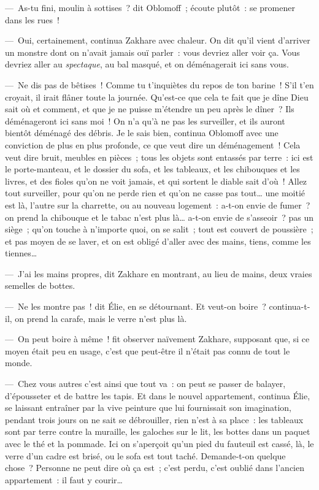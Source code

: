 \documentclass[french,twoside]{book} %
\begin{document}
— As-tu fini, moulin à sottises ? dit Oblomoff ; écoute plutôt : se promener dans les rues !\par
— Oui, certainement, continua Zakhare avec chaleur. On dit qu’il vient d’arriver un monstre dont on n’avait jamais ouï parler : vous devriez aller voir ça. Vous devriez aller au \emph{spectaque}, au bal masqué, et on déménagerait ici sans vous.\par
— Ne dis pas de bêtises ! Comme tu t’inquiètes du repos de ton barine ! S’il t’en croyait, il irait flâner toute la journée. Qu’est-ce que cela te fait que je dîne Dieu sait où et comment, et que je ne puisse m’étendre un peu après le dîner ? Ils déménageront ici sans moi ! On n’a qu’à ne pas les surveiller, et ils auront bientôt déménagé des débris. Je le sais bien, continua Oblomoff avec une conviction de plus en plus profonde, ce que veut dire un déménagement ! Cela veut dire bruit, meubles en pièces ; tous les objets sont entassés par terre : ici est le porte-manteau, et le dossier du sofa, et les tableaux, et les chibouques et les livres, et des fioles qu’on ne voit jamais, et qui sortent le diable sait d’où ! Allez tout surveiller, pour qu’on ne perde rien et qu’on ne casse pas tout… une moitié est là, l’autre sur la charrette, ou au nouveau logement : a-t-on envie de fumer ? on prend la chibouque et le tabac n’est plus là… a-t-on envie de s’asseoir ? pas un siège ; qu’on touche à n’importe quoi, on se salit ; tout est couvert de poussière ; et pas moyen de se laver, et on est obligé d’aller avec des mains, tiens, comme les tiennes…\par
— J’ai les mains propres, dit Zakhare en montrant, au lieu de mains, deux vraies semelles de bottes.\par
— Ne les montre pas ! dit Élie, en se détournant. Et veut-on boire ? continua-t-il, on prend la carafe, mais le verre n’est plus là.\par
— On peut boire à même ! fit observer naïvement Zakhare, supposant que, si ce moyen était peu en usage, c’est que peut-être il n’était pas connu de tout le monde.\par
— Chez vous autres c’est ainsi que tout va : on peut se passer de balayer, d’épousseter et de battre les tapis. Et dans le nouvel appartement, continua Élie, se laissant entraîner par la vive peinture que lui fournissait son imagination, pendant trois jours on ne sait se débrouiller, rien n’est à sa place : les tableaux sont par terre contre la muraille, les galoches sur le lit, les bottes dans un paquet avec le thé et la pommade. Ici on s’aperçoit qu’un pied du fauteuil est cassé, là, le verre d’un cadre est brisé, ou le sofa est tout taché. Demande-t-on quelque chose ? Personne ne peut dire où ça est ; c’est perdu, c’est oublié dans l’ancien appartement : il faut y courir…\par
\end{document}
